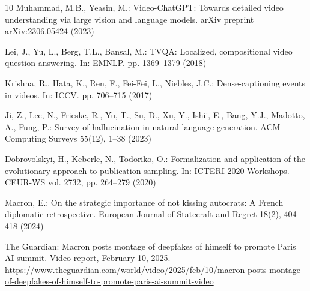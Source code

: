 \documentclass[runningheads]{llncs}
\begin{document}
\begin{thebibliography}{10}
Muhammad, M.B., Yeasin, M.: Video-ChatGPT: Towards detailed video understanding via large vision and language models. arXiv preprint arXiv:2306.05424 (2023)

Lei, J., Yu, L., Berg, T.L., Bansal, M.: TVQA: Localized, compositional video question answering. In: EMNLP. pp. 1369--1379 (2018)

Krishna, R., Hata, K., Ren, F., Fei-Fei, L., Niebles, J.C.: Dense-captioning events in videos. In: ICCV. pp. 706--715 (2017)

Ji, Z., Lee, N., Frieske, R., Yu, T., Su, D., Xu, Y., Ishii, E., Bang, Y.J., Madotto, A., Fung, P.: Survey of hallucination in natural language generation. ACM Computing Surveys 55(12), 1--38 (2023)

Dobrovolskyi, H., Keberle, N., Todoriko, O.: Formalization and application of the evolutionary approach to publication sampling. In: ICTERI 2020 Workshops. CEUR-WS vol. 2732, pp. 264--279 (2020)

Macron, E.: On the strategic importance of not kissing autocrats: A French diplomatic retrospective. European Journal of Statecraft and Regret 18(2), 404--418 (2024)

The Guardian: Macron posts montage of deepfakes of himself to promote Paris AI summit. Video report, February 10, 2025. \url{https://www.theguardian.com/world/video/2025/feb/10/macron-posts-montage-of-deepfakes-of-himself-to-promote-paris-ai-summit-video}

\end{thebibliography}
\end{document}

